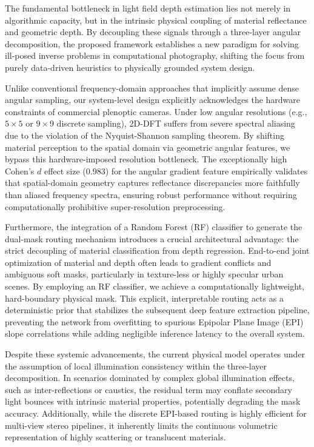 The fundamental bottleneck in light field depth estimation lies not merely in algorithmic capacity, but in the intrinsic physical coupling of material reflectance and geometric depth. By decoupling these signals through a three-layer angular decomposition, the proposed framework establishes a new paradigm for solving ill-posed inverse problems in computational photography, shifting the focus from purely data-driven heuristics to physically grounded system design.

Unlike conventional frequency-domain approaches that implicitly assume dense angular sampling, our system-level design explicitly acknowledges the hardware constraints of commercial plenoptic cameras. Under low angular resolutions (e.g., $5 \times 5$ or $9 \times 9$ discrete sampling), 2D-DFT suffers from severe spectral aliasing due to the violation of the Nyquist-Shannon sampling theorem. By shifting material perception to the spatial domain via geometric angular features, we bypass this hardware-imposed resolution bottleneck. The exceptionally high Cohen's $d$ effect size ($0.983$) for the angular gradient feature empirically validates that spatial-domain geometry captures reflectance discrepancies more faithfully than aliased frequency spectra, ensuring robust performance without requiring computationally prohibitive super-resolution preprocessing.

Furthermore, the integration of a Random Forest (RF) classifier to generate the dual-mask routing mechanism introduces a crucial architectural advantage: the strict decoupling of material classification from depth regression. End-to-end joint optimization of material and depth often leads to gradient conflicts and ambiguous soft masks, particularly in texture-less or highly specular urban scenes. By employing an RF classifier, we achieve a computationally lightweight, hard-boundary physical mask. This explicit, interpretable routing acts as a deterministic prior that stabilizes the subsequent deep feature extraction pipeline, preventing the network from overfitting to spurious Epipolar Plane Image (EPI) slope correlations while adding negligible inference latency to the overall system.

Despite these systemic advancements, the current physical model operates under the assumption of local illumination consistency within the three-layer decomposition. In scenarios dominated by complex global illumination effects, such as inter-reflections or caustics, the residual term may conflate secondary light bounces with intrinsic material properties, potentially degrading the mask accuracy. Additionally, while the discrete EPI-based routing is highly efficient for multi-view stereo pipelines, it inherently limits the continuous volumetric representation of highly scattering or translucent materials.

